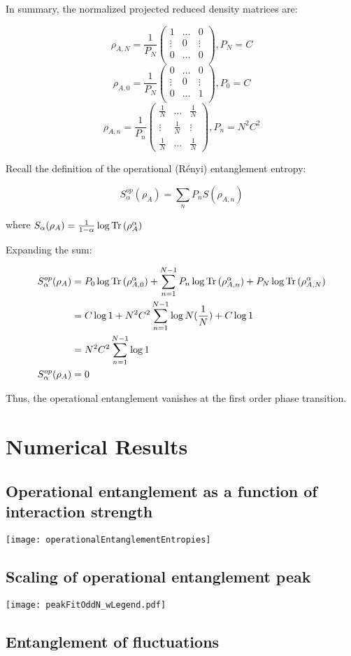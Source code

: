 In summary, the normalized projected reduced density matrices are:

\[ \rho_{A,N} = \frac{1}{P_{N}} \begin{pmatrix}
1 & \dots & 0 \\ 
\vdots & 0 & \vdots \\
0 & \dots & 0 \\
\end{pmatrix}, P_{N}=C \]
\[ \rho_{A,0} = \frac{1}{P_{N}} \begin{pmatrix}
0 & \dots & 0 \\ 
\vdots & 0 & \vdots \\
0 & \dots & 1 \\
\end{pmatrix}, P_{0}=C\]
\[ \rho_{A,n} = \frac{1}{P_{n}} \begin{pmatrix}
\frac{1}{N} & \dots & \frac{1}{N} \\ 
\vdots & \frac{1}{N} & \vdots \\
\frac{1}{N} & \dots & \frac{1}{N}
\end{pmatrix}, P_{n}=N^2C^2 \]

Recall the definition of the operational (R\'enyi) entanglement entropy:

\[S_{\alpha}^{op}(\rho_{A}) = \sum_{n} P_{n}S(\rho_{A,n})\]

where $S_{\alpha}(\rho_A) = \frac{1}{1-\alpha} \log{\operatorname{Tr}{(\rho_A^{\alpha})}}$

Expanding the sum:

\[ \begin{aligned} S_{\alpha}^{op}(\rho_{A}) &= P_{0} \log{\operatorname{Tr}{(\rho_{A,0}^{\alpha})}} + \sum_{n=1}^{N-1} P_{n} \log{\operatorname{Tr}{(\rho_{A,n}^{\alpha})}} + P_{N} \log{\operatorname{Tr}{(\rho_{A,N}^{\alpha})}} \\
&= C \log{1} + N^2C^2 \sum_{n=1}^{N-1} \log{N(\frac{1}{N})} + C \log{1} \\
&= N^2C^2 \sum_{n=1}^{N-1} \log{1} \\
S_{\alpha}^{op}(\rho_{A}) &= 0 \\
\end{aligned} \]

Thus, the operational entanglement vanishes at the first order phase transition.


	
\section{Numerical Results}
	\subsection{Operational entanglement as a function of interaction strength}
		\texttt{[image: operationalEntanglementEntropies]}
	\subsection{Scaling of operational entanglement peak}
		\texttt{[image: peakFitOddN\_wLegend.pdf]}
	\subsection{Entanglement of fluctuations}
	
